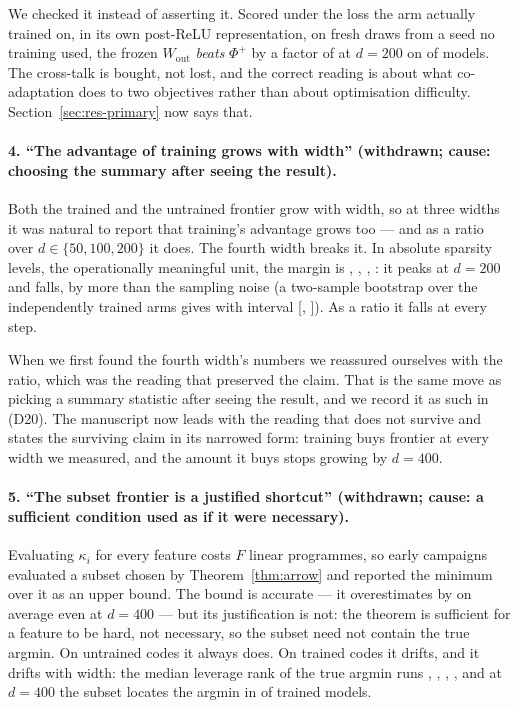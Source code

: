 We checked it instead of asserting it. Scored under the loss the arm actually trained on, in its own
post-ReLU representation, on fresh draws from a seed no training used, the frozen $W_{\mathrm{out}}$
\emph{beats} $\Phi^{+}$ by a factor of \EeightFrozenTwoHundredTaskGain{} at $d=200$ on
\EeightFrozenTwoHundredTaskWins{} of \EeightSeeds{} models. The cross-talk is bought, not lost, and
the correct reading is about what co-adaptation does to two objectives rather than about optimisation
difficulty. Section~\ref{sec:res-primary} now says that.

\paragraph{4. ``The advantage of training grows with width'' (withdrawn; cause: choosing the summary
after seeing the result).} Both the trained and the untrained frontier grow with width, so at three
widths it was natural to report that training's advantage grows too --- and as a ratio over
$d\in\{50,100,200\}$ it does. The fourth width breaks it. In absolute sparsity levels, the
operationally meaningful unit, the margin is \MarginFiftyGap, \MarginHundredGap,
\MarginTwoHundredGap, \MarginFourHundredGap: it peaks at $d=200$ and falls, by more than the sampling
noise (a two-sample bootstrap over the independently trained arms gives \MarginDrop{} with interval
[\MarginDropCiLow, \MarginDropCiHigh]). As a ratio it falls at every step.

When we first found the fourth width's numbers we reassured ourselves with the ratio, which was the
reading that preserved the claim. That is the same move as picking a summary statistic after seeing
the result, and we record it as such in  (D20). The manuscript now leads
with the reading that does not survive and states the surviving claim in its narrowed form: training
buys frontier at every width we measured, and the amount it buys stops growing by $d=400$.

\paragraph{5. ``The subset frontier is a justified shortcut'' (withdrawn; cause: a sufficient
condition used as if it were necessary).} Evaluating $\kappa_i$ for every feature costs $F$ linear
programmes, so early campaigns evaluated a subset chosen by Theorem~\ref{thm:arrow} and reported the
minimum over it as an upper bound. The bound is accurate --- it overestimates by
\SubsetFourHundredOver{} on average even at $d=400$ --- but its justification is not: the theorem is
sufficient for a feature to be hard, not necessary, so the subset need not contain the true argmin.
On untrained codes it always does. On trained codes it drifts, and it drifts with width: the median
leverage rank of the true argmin runs \SubsetFiftyRank, \SubsetHundredRank, \SubsetTwoHundredRank,
\SubsetFourHundredRank, and at $d=400$ the subset locates the argmin in \SubsetFourHundredFound{} of
\ScSeeds{} trained models.

